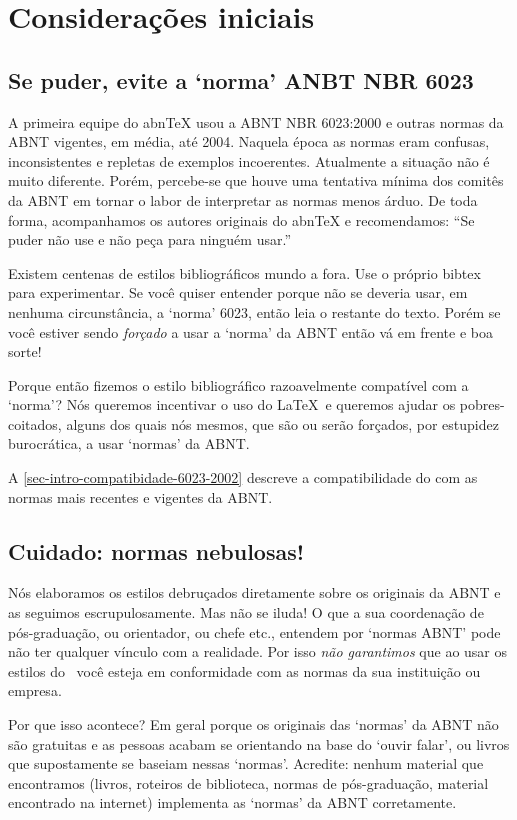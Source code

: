 \documentclass[a4paper]{ltxdoc}
\begin{document}
\section{Considerações iniciais}

\subsection{Se puder, evite a `norma' ANBT NBR 6023}

A primeira equipe do abnTeX usou a ABNT NBR 6023:2000 e outras normas da ABNT
vigentes, em média, até 2004. Naquela época as normas eram confusas,
inconsistentes e repletas de exemplos incoerentes. Atualmente a situação não é
muito diferente. Porém, percebe-se que houve uma tentativa mínima dos comitês da
ABNT em tornar o labor de interpretar as normas menos árduo. De toda forma,
acompanhamos os autores originais do abnTeX e recomendamos: ``Se puder não use e
não peça para ninguém usar.''

Existem centenas de estilos bibliográficos mundo a fora. Use o próprio
\textsf{bibtex} para experimentar. Se você quiser entender porque não se deveria
usar, em nenhuma circunstância, a `norma' 6023, então leia o restante do texto.
Porém se você estiver sendo \emph{forçado} a usar a `norma' da ABNT então vá em
frente e boa sorte!

Porque então fizemos o estilo bibliográfico razoavelmente compatível com a
`norma'? Nós queremos incentivar o uso do \LaTeX\  e queremos ajudar os
pobres-coitados, alguns dos quais nós mesmos, que são ou serão forçados, por
estupidez burocrática, a usar `normas' da ABNT.

A \autoref{sec-intro-compatibidade-6023-2002} descreve a compatibilidade do
 com as normas mais recentes e vigentes da ABNT.

\subsection{Cuidado: normas nebulosas!}

Nós elaboramos os estilos debruçados diretamente sobre os originais da ABNT
e as seguimos escrupulosamente. Mas não se iluda! O que a sua coordenação
de pós-graduação, ou orientador, ou chefe etc., entendem por `normas ABNT'
pode não ter qualquer vínculo com a realidade. Por isso \emph{não garantimos}
que ao usar os estilos do \abnTeX\ você esteja em conformidade com as normas
da sua instituição ou empresa.

Por que isso acontece? Em geral porque os originais das `normas' da ABNT não
são gratuitas e as pessoas acabam se orientando na base do
`ouvir falar', ou livros que supostamente se baseiam nessas `normas'.
Acredite: nenhum material que encontramos (livros, roteiros de biblioteca,
normas de pós-graduação, material encontrado na internet) implementa
as `normas' da ABNT corretamente.
\end{document}
